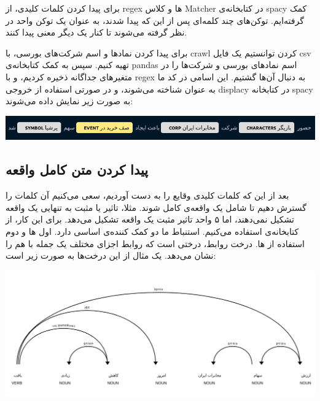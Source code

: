 \documentclass[a4paper,12pt]{article}
\begin{document}
برای پیدا کردن کلمات کلیدی، از 
regex
ها و کلاس 
Matcher
در کتابخانه‌ی 
spacy
کمک گرفته‌ایم. توکن‌های چند کلمه‌ای پس از این که پیدا شدند، به عنوان یک توکن واحد در نظر 
گرفته می‌شوند تا کنار یک دیگر معنی پیدا کنند. 

برای پیدا کردن نماد‌ها و اسم شرکت‌های بورسی، با 
crawl
کردن توانستیم یک فایل 
csv
تهیه کنیم. سپس به کمک کتابخانه‌ی 
pandas
اسم نماد‌های بورسی و شرکت‌ها را در متغیر‌های جداگانه ذخیره کردیم، و با 
regex
به دنبال آن‌ها گشتیم. این اسامی در کد ما به عنوان
شناخته می‌شوند، و در صورتی استفاده از خروجی
displacy
در کتابخانه
spacy
به صورت زیر نمایش داده می‌شوند: 


\begin{center}
	\includegraphics[scale=0.5]{images/NE.png}
\end{center}





\subsection*{پیدا کردن متن کامل واقعه}

بعد از این که کلمات کلیدی وقایع را به دست آوردیم،‌ سعی می‌کنیم آن کلمات را گسترش دهیم 
تا شامل یک واقعه‌ی کامل شوند. مثلا، تاثیر یا مثبت به تنهایی یک واقعه تشکیل نمی‌دهند، اما ۵ واحد تاثیر 
مثبت یک واقعه تشکیل می‌دهد. برای این کار، از کتابخانه‌ی
استفاده می‌کنیم. استنباط ما دو کمک کننده‌ی اساسی دارد. اول
ها
 و دوم استفاده از 
ها. 
درخت روابط، درختی است که روابط اجزای مختلف یک جمله با هم را نشان می‌دهد. یک مثال از این 
درخت‌ها به صورت زیر است: 

\begin{center}
	\includegraphics[scale=0.3]{images/DEP.png}
\end{center}
\end{document}

